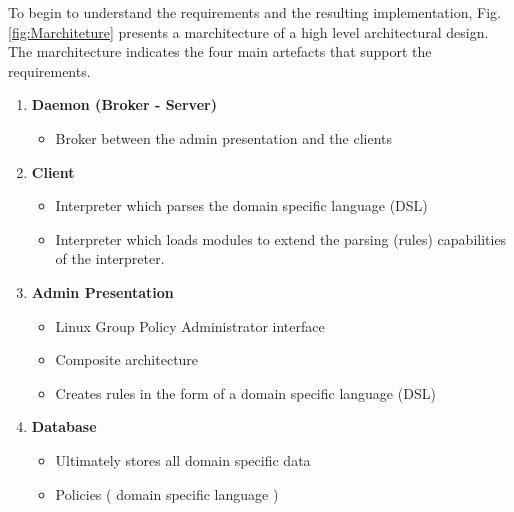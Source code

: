 	\vspace{3mm}
	\normalsize
	{
		To begin to understand the requirements and the resulting implementation,  Fig. \ref{fig:Marchiteture} 
		presents a marchitecture of a high level architectural design.  
		The marchitecture indicates the four main artefacts that support the requirements.
		
		\vspace{-3mm}
		\begin{multicols}{2}
		
			\begin{enumerate}[itemsep=0pt,parsep=0pt]

				\item \textbf{Daemon (Broker - Server)} 
					\begin{itemize}
						\item Broker between the admin presentation and the clients 
					\end{itemize}	
					
				\item \textbf{Client} 
					\begin{itemize}
						\item Interpreter which parses the domain specific language (DSL)
						\item Interpreter which loads modules to extend the parsing (rules) capabilities of the interpreter.
					\end{itemize}

			\columnbreak
					
				\item \textbf{Admin Presentation}	
					\begin{itemize}
						\item Linux Group Policy Administrator interface 
						\item Composite architecture
						\item Creates rules in the form of a domain specific language (DSL)
					\end{itemize}	
					
				\item \textbf{Database} 
					\begin{itemize}
						\item Ultimately stores all domain specific data
						\item Policies ( domain specific language )
					\end{itemize}	
					
			\end{enumerate}		
			

\end{multicols}}
